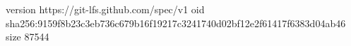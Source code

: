 version https://git-lfs.github.com/spec/v1
oid sha256:9159f8b23c3eb736c679b16f19217c3241740d02bf12e2f61417f6383d04ab46
size 87544
